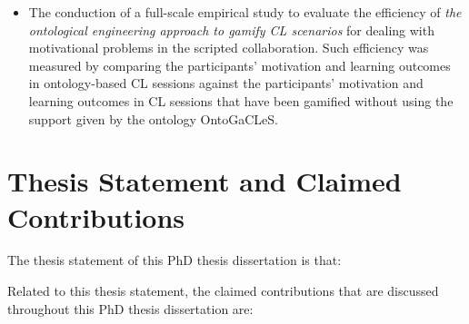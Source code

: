 \begin{description}
\begin{itemize}
\item
The conduction of a full-scale empirical study to evaluate the efficiency of \emph{the ontological engineering approach to gamify CL scenarios} for dealing with motivational problems in the scripted collaboration.
Such efficiency was measured by comparing the participants' motivation and learning outcomes in ontology-based CL sessions against the participants' motivation and learning outcomes in CL sessions that have been gamified without using the support given by the ontology OntoGaCLeS.
\end{itemize}
\end{description}

\section{Thesis Statement and Claimed Contributions}
\label{sec:thesis-statement-and-claimed-contributions}

The thesis statement of this PhD thesis dissertation is that:


Related to this thesis statement, the claimed contributions that are discussed throughout this PhD thesis dissertation are:

